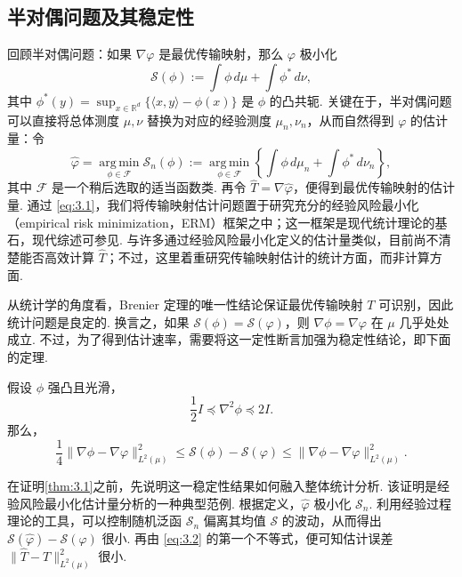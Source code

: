 \subsection{半对偶问题及其稳定性}\label{sec:3.2}
回顾半对偶问题：如果 $\nabla\varphi$ 是最优传输映射，那么 $\varphi$ 极小化
$$\mathcal S(\phi):=\int\phi\,d\mu+\int\phi^*\,d\nu,$$
其中 $\phi^*(y)=\sup_{x\in\mathbb R^d}\{\langle x,y\rangle-\phi(x)\}$ 是 $\phi$ 的凸共轭. 关键在于，半对偶问题可以直接将总体测度 $\mu,\nu$ 替换为对应的经验测度 $\mu_n,\nu_n$，从而自然得到 $\varphi$ 的估计量：令
\begin{equation}\label{eq:3.1}
\widehat\varphi=\operatorname*{arg\,min}_{\phi\in\mathcal F}\mathcal S_n(\phi)
:=\operatorname*{arg\,min}_{\phi\in\mathcal F}\left\{\int\phi\,d\mu_n+\int\phi^*\,d\nu_n\right\},
\end{equation}
其中 $\mathcal F$ 是一个稍后选取的适当函数类. 再令 $\widehat T=\nabla\widehat\varphi$，便得到最优传输映射的估计量. 通过 \eqref{eq:3.1}，我们将传输映射估计问题置于研究充分的经验风险最小化（empirical risk minimization，ERM）框架之中；这一框架是现代统计理论的基石，现代综述可参见\cite{ref318}. 与许多通过经验风险最小化定义的估计量类似，目前尚不清楚能否高效计算 $\widehat T$；不过，这里着重研究传输映射估计的统计方面，而非计算方面.

从统计学的角度看，Brenier 定理的唯一性结论保证最优传输映射 $T$ 可识别，因此统计问题是良定的. 换言之，如果 $\mathcal S(\phi)=\mathcal S(\varphi)$，则 $\nabla\phi=\nabla\varphi$ 在 $\mu$ 几乎处处成立. 不过，为了得到估计速率，需要将这一定性断言加强为稳定性结论，即下面的定理.

\begin{theorem}\label{thm:3.1}
假设 $\phi$ 强凸且光滑，
$$\frac12 I\preceq\nabla^2\phi\preceq2I.$$
那么，
\begin{equation}\label{eq:3.2}
\frac14\|\nabla\phi-\nabla\varphi\|_{L^2(\mu)}^2
\le\mathcal S(\phi)-\mathcal S(\varphi)
\le\|\nabla\phi-\nabla\varphi\|_{L^2(\mu)}^2.
\end{equation}
\end{theorem}

在证明\autoref{thm:3.1}之前，先说明这一稳定性结果如何融入整体统计分析. 该证明是经验风险最小化估计量分析的一种典型范例. 根据定义，$\widehat\varphi$ 极小化 $\mathcal S_n$. 利用经验过程理论的工具，可以控制随机泛函 $\mathcal S_n$ 偏离其均值 $\mathcal S$ 的波动，从而得出 $\mathcal S(\widehat\varphi)-\mathcal S(\varphi)$ 很小. 再由 \eqref{eq:3.2} 的第一个不等式，便可知估计误差 $\|\widehat T-T\|_{L^2(\mu)}^2$ 很小.


